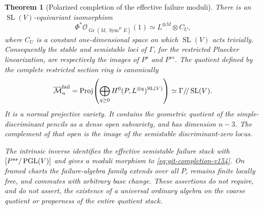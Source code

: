 \documentclass[11pt,reqno]{amsart}
\numberwithin{equation}{section}
\newtheorem{theorem}{Theorem}[section]
\theoremstyle{definition}\newtheorem{definition}[theorem]{Definition}
\theoremstyle{remark}\newtheorem{remark}[theorem]{Remark}
\newcommand{\OO}{\mathcal O}\newcommand{\II}{\mathcal I}
\DeclareMathOperator{\Sym}{Sym}\DeclareMathOperator{\Gr}{Gr}
\begin{document}
\begin{theorem}[Polarized completion of the effective failure moduli]
\label{thm:polarized-completion-v154}
There is an $\operatorname{SL}(V)$-equivariant isomorphism
\begin{equation}\label{eq:polarization-v154}
 \Phi^*\OO_{\Gr(M,\Sym^D E)}(1)\simeq L^{\otimes M}
                 \otimes C_U,
\end{equation}
where $C_U$ is a constant one-dimensional space on which
$\operatorname{SL}(V)$ acts trivially. Consequently the stable and
semistable loci of $\Gamma$, for the restricted Pluecker
linearization, are respectively the images of $P^s$ and $P^{ss}$.
The quotient defined by the complete restricted section ring is
canonically
\begin{equation}\label{eq:git-completion-v154}
 \overline{\mathcal M}^{\mathrm{fail}}_n
 =\operatorname{Proj}\!\left(\bigoplus_{q\geq0}
                  H^0(P,L^{\otimes q})^{\operatorname{SL}(V)}\right)
 \simeq\Gamma/\!/\operatorname{SL}(V).
\end{equation}
It is a normal projective variety. It contains the geometric quotient
of the simple-discriminant pencils as a dense open subvariety, and
has dimension $n-3$. The complement of that open is the image of the
semistable discriminant-zero locus.

The intrinsic inverse identifies the effective semistable failure
stack with $[P^{ss}/\operatorname{PGL}(V)]$ and gives a moduli morphism to
\eqref{eq:git-completion-v154}. On framed charts the failure-algebra
family extends over all $P$, remains finite locally free, and
commutes with arbitrary base change. These assertions do not require,
and do not assert, the existence of a universal ordinary algebra on
the coarse quotient or properness of the entire quotient stack.
\end{theorem}
\end{document}
